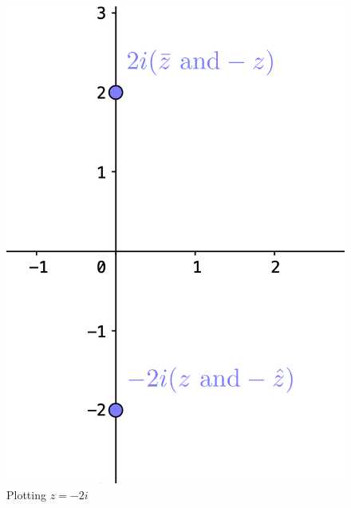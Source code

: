 \documentclass[12pt]{article}
\makeatletter
\theoremstyle{homework}
\newenvironment{exercise}[1]
{\def\@currentlabel{#1}\exercisecore}
{\endexercisecore}
\makeatother
\begin{document}
\begin{exercise}{4}
\begin{figure}[H]
        \begin{center}
        \caption{Plotting $z = -2i$}
        \includegraphics[width= .40 \textwidth]{plot3.png}
        \end{center}
    \end{figure}
\end{exercise}
\vspace{1in}
\end{document}
